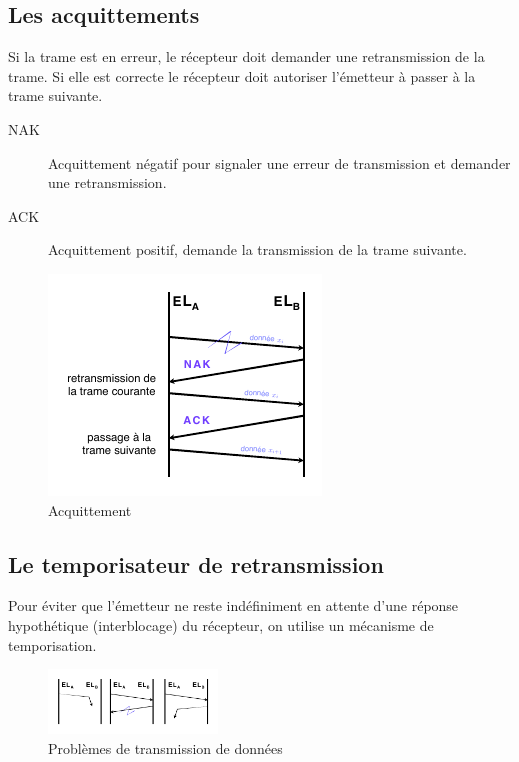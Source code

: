 \documentclass[11pt,english,french]{scrreprt}
\theoremstyle{remark}
\theoremstyle{definition}
\begin{document}
\subsection*{Les acquittements} %
Si la trame est en erreur, le récepteur doit demander une retransmission de la trame. Si elle est correcte le récepteur doit autoriser l'émetteur à passer à la trame suivante.

\begin{description}
	\item[NAK] Acquittement négatif pour signaler une erreur de transmission et demander une retransmission.
	\item[ACK] Acquittement positif, demande la transmission de la trame suivante.
\end{description}

\begin{figure}[h!]
	\center
	\includegraphics[scale=1.2]{graphes/acquittement}
	\caption{Acquittement}
\end{figure}

\subsection*{Le temporisateur de retransmission} %
Pour éviter que l'émetteur ne reste indéfiniment en attente d'une réponse hypothétique (interblocage) du récepteur, on utilise un mécanisme de temporisation.

\begin{figure}
	\vspace{-15pt}
	\begin{center}
		\includegraphics[width=0.40\textwidth]{graphes/temporisation1}
		\vspace{-15pt}
		\caption{Problèmes de transmission de données}
	\end{center}
	
\end{figure}
\end{document}
